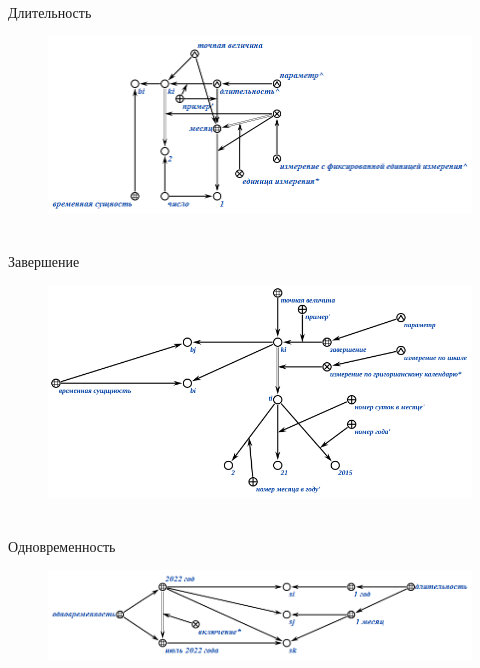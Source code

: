 \begin{frame}{\\Длительность}
	\topline
	\justifying
	\vspace{10mm}
	\begin{SCn}
		\begin{figure}[H]
			\includegraphics[scale=0.65]{./figures/sd_temp_entities/duration.png}
		\end{figure}
	\end{SCn}
\end{frame}

\begin{frame}{\\Завершение}
	\topline
	\justifying
	\vspace{10mm}
	\begin{SCn}
		\begin{figure}[H]
			\includegraphics[scale=0.6]{./figures/sd_temp_entities/completion.png}
		\end{figure}
	\end{SCn}
\end{frame}

\begin{frame}{\\Одновременность}
	\topline
	\justifying
	\vspace{10mm}
	\begin{SCn}
		\begin{figure}[H]
			\includegraphics[scale=0.65]{./figures/sd_temp_entities/simultaneity.png}
		\end{figure}
	\end{SCn}
\end{frame}
